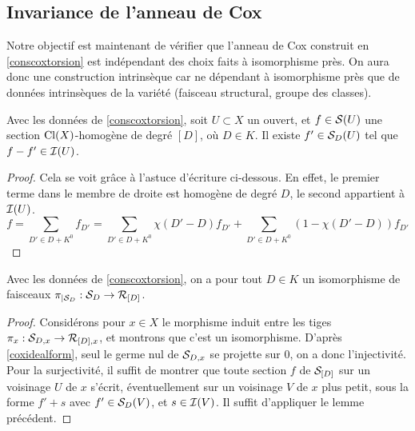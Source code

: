 \subsection{Invariance de l'anneau de Cox}

Notre objectif est maintenant de vérifier que l'anneau de Cox construit en \ref{conscoxtorsion} est indépendant des choix faits à isomorphisme près. On aura donc une construction intrinsèque car ne dépendant à isomorphisme près que de données intrinsèques de la variété (faisceau structural, groupe des classes).

\begin{lem}\label{LemmeCoxRelevelement}
Avec les données de \ref{conscoxtorsion}, soit $U\subset X$ un ouvert, et $f\in \mathcal{S}(U)$ une section $\operatorname{Cl}(X)$-homogène de degré $[D]$, où $D\in K$. Il existe $f'\in \mathcal{S}_D(U)$ tel que $f-f'\in\mathcal{I}(U)$.
\end{lem}
\begin{proof}
Cela se voit grâce à l'astuce d'écriture ci-dessous. En effet, le premier terme dans le membre de droite est homogène de degré $D$, le second appartient à $\mathcal{I}(U)$.
$$f=\sum_{D'\in D+K^0}f_{D'}=\sum_{D'\in D+K^0}\chi(D'-D)f_{D'}+ \sum_{D'\in D+K^0}(1-\chi(D'-D))f_{D'}$$
\end{proof}


\begin{prop}\label{coxsheafiso2}
Avec les données de \ref{conscoxtorsion}, on a pour tout $D\in K$ un isomorphisme de faisceaux $\pi_{|\mathcal{S}_D}:\mathcal{S}_D\rightarrow \mathcal{R}_{[D]}$.
\end{prop}
\begin{proof}
Considérons pour $x\in X$ le morphisme induit entre les tiges $\pi_x:\mathcal{S}_{D,x}\rightarrow \mathcal{R}_{[D],x}$, et montrons que c'est un isomorphisme. D'après \ref{coxidealform}, seul le germe nul de $\mathcal{S}_{D,x}$ se projette sur $0$, on a donc l'injectivité. Pour la surjectivité, il suffit de montrer que toute section $f$ de $\mathcal{S}_{[D]}$ sur un voisinage $U$ de $x$ s'écrit, éventuellement sur un voisinage $V$ de $x$ plus petit, sous la forme $f'+s$ avec $f'\in \mathcal{S}_D(V)$, et $s\in \mathcal{I}(V)$. Il suffit d'appliquer le lemme précédent.
\end{proof}

